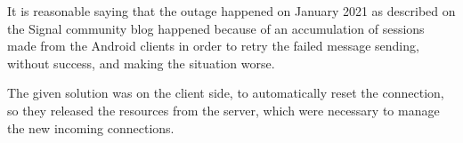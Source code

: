 It is reasonable saying that the outage happened on January 2021 as described on the Signal community blog \cite{outage} happened because of an accumulation of sessions made from the Android clients in order to retry the failed message sending, without success, and making the situation worse.

The given solution was on the client side, to automatically reset the connection, so they released the resources from the server, which were necessary to manage the new incoming connections.